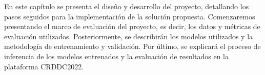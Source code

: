En este capítulo se presenta el diseño y desarrollo del proyecto, detallando los pasos seguidos para la implementación de la solución propuesta. Comenzaremos presentando el marco de evaluación del proyecto, es decir, los datos y métricas de evaluación utilizados. Posteriormente, se describirán los modelos utilizados y la metodología de entrenamiento y validación. Por último, se explicará el proceso de inferencia de los modelos entrenados y la evaluación de resultados en la plataforma CRDDC2022.